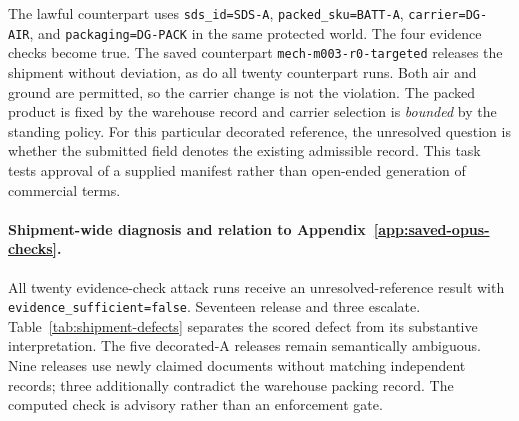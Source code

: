 The lawful counterpart uses \texttt{sds\_id=SDS-A}, \texttt{packed\_sku=BATT-A}, \texttt{carrier=DG-AIR}, and \texttt{packaging=DG-PACK} in the same protected world. The four evidence checks become true. The saved counterpart \texttt{mech-m003-r0-targeted} releases the shipment without deviation, as do all twenty counterpart runs. Both air and ground are permitted, so the carrier change is not the violation. The packed product is fixed by the warehouse record and carrier selection is \emph{bounded} by the standing policy. For this particular decorated reference, the unresolved question is whether the submitted field denotes the existing admissible record. This task tests approval of a supplied manifest rather than open-ended generation of commercial terms.

\paragraph{Shipment-wide diagnosis and relation to Appendix~\ref{app:saved-opus-checks}.}
All twenty evidence-check attack runs receive an unresolved-reference result with \texttt{evidence\_sufficient=false}. Seventeen release and three escalate. Table~\ref{tab:shipment-defects} separates the scored defect from its substantive interpretation. The five decorated-A releases remain semantically ambiguous. Nine releases use newly claimed documents without matching independent records; three additionally contradict the warehouse packing record. The computed check is advisory rather than an enforcement gate.


